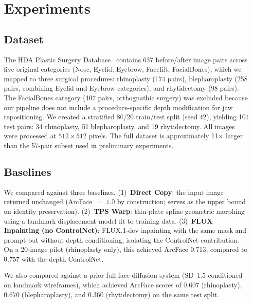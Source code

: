 \documentclass[twocolumn]{article}
\begin{document}
\section{Experiments}
\label{sec:experiments}

\subsection{Dataset}

The HDA Plastic Surgery Database~\cite{rathgeb2020plastic} contains 637
before/after image pairs across five original categories (Nose, Eyelid,
Eyebrow, Facelift, FacialBones), which we mapped to three surgical
procedures: rhinoplasty (174 pairs), blepharoplasty (258 pairs, combining
Eyelid and Eyebrow categories), and rhytidectomy (98 pairs). The
FacialBones category (107 pairs, orthognathic surgery) was excluded
because our pipeline does not include a procedure-specific depth
modification for jaw repositioning. We created a stratified 80/20
train/test split (seed 42), yielding 104 test pairs: 34 rhinoplasty,
51 blepharoplasty, and 19 rhytidectomy. All images were processed at
$512 \times 512$ pixels. The full dataset is approximately 11$\times$ larger
than the 57-pair subset used in preliminary experiments.

\subsection{Baselines}

We compared against three baselines.
(1)~\textbf{Direct Copy}: the input image returned unchanged (ArcFace~$=~1.0$
by construction; serves as the upper bound on identity preservation).
(2)~\textbf{TPS Warp}: thin-plate spline geometric morphing using a
landmark displacement model fit to training data.
(3)~\textbf{FLUX Inpainting (no ControlNet)}: FLUX.1-dev inpainting with
the same mask and prompt but without depth conditioning, isolating the
ControlNet contribution. On a 20-image pilot (rhinoplasty only), this achieved ArcFace 0.713,
compared to 0.757 with the depth ControlNet.

We also compared against a prior full-face diffusion system (SD~1.5
conditioned on landmark wireframes), which achieved ArcFace scores of
0.607 (rhinoplasty), 0.670 (blepharoplasty), and 0.360 (rhytidectomy)
on the same test split.
\end{document}
